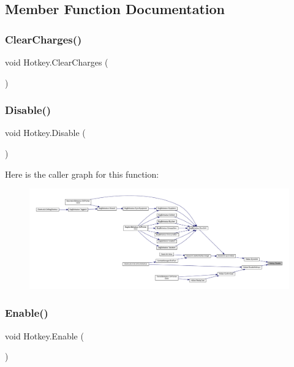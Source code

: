 \subsection{Member Function Documentation}
\mbox{\label{class_hotkey_a7d290d1777e2971d3bbf99d23322d4af}} 
\subsubsection{\texorpdfstring{ClearCharges()}{ClearCharges()}}
{\footnotesize\ttfamily void Hotkey.\+Clear\+Charges (\begin{DoxyParamCaption}{ }\end{DoxyParamCaption})}

\mbox{\label{class_hotkey_a0b90f1841f8cbe70bf62447affd70bd1}} 
\subsubsection{\texorpdfstring{Disable()}{Disable()}}
{\footnotesize\ttfamily void Hotkey.\+Disable (\begin{DoxyParamCaption}{ }\end{DoxyParamCaption})}

Here is the caller graph for this function\+:\nopagebreak
\begin{figure}[H]
\begin{center}
\leavevmode
\includegraphics[width=350pt]{class_hotkey_a0b90f1841f8cbe70bf62447affd70bd1_icgraph}
\end{center}
\end{figure}
\mbox{\label{class_hotkey_ae078d4716dbd3a3c703a3ef341e56562}} 
\subsubsection{\texorpdfstring{Enable()}{Enable()}}
{\footnotesize\ttfamily void Hotkey.\+Enable (\begin{DoxyParamCaption}{ }\end{DoxyParamCaption})}


